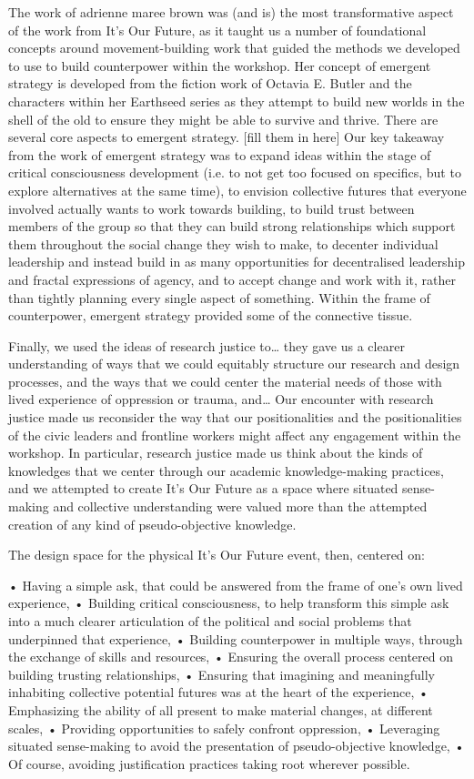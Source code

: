 The work of adrienne maree brown was (and is) the most transformative aspect of the work from It’s Our Future, as it taught us a number of foundational concepts around movement-building work that guided the methods we developed to use to build counterpower within the workshop. Her concept of emergent strategy is developed from the fiction work of Octavia E. Butler and the characters within her Earthseed series as they attempt to build new worlds in the shell of the old to ensure they might be able to survive and thrive.  There are several core aspects to emergent strategy.  [fill them in here] Our key takeaway from the work of emergent strategy was to expand ideas within the stage of critical consciousness development (i.e. to not get too focused on specifics, but to explore alternatives at the same time), to envision collective futures that everyone involved actually wants to work towards building, to build trust between members of the group so that they can build strong relationships which support them throughout the social change they wish to make, to decenter individual leadership and instead build in as many opportunities for decentralised leadership and fractal expressions of agency, and to accept change and work with it, rather than tightly planning every single aspect of something. Within the frame of counterpower, emergent strategy provided some of the connective tissue. 

Finally, we used the ideas of research justice to… they gave us a clearer understanding of ways that we could equitably structure our research and design processes, and the ways that we could center the material needs of those with lived experience of oppression or trauma, and… Our encounter with research justice made us reconsider the way that our positionalities and the positionalities of the civic leaders and frontline workers might affect any engagement within the workshop. In particular, research justice made us think about the kinds of knowledges that we center through our academic knowledge-making practices, and we attempted to create It’s Our Future as a space where situated sense-making and collective understanding were valued more than the attempted creation of any kind of pseudo-objective knowledge. 
	
The design space for the physical It’s Our Future event, then, centered on:

•	Having a simple ask, that could be answered from the frame of one’s own lived experience,
•	Building critical consciousness, to help transform this simple ask into a much clearer articulation of the political and social problems that underpinned that experience,
•	Building counterpower in multiple ways, through the exchange of skills and resources,
•	Ensuring the overall process centered on building trusting relationships,
•	Ensuring that imagining and meaningfully inhabiting collective potential futures was at the heart of the experience,
•	Emphasizing the ability of all present to make material changes, at different scales,
•	Providing opportunities to safely confront oppression,
•	Leveraging situated sense-making to avoid the presentation of pseudo-objective knowledge,
•	Of course, avoiding justification practices taking root wherever possible. 

